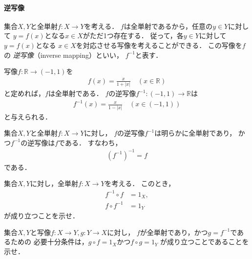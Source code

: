    \paragraph{逆写像}
    集合$X,  Y$と全単射$f: X \longrightarrow Y$を考える．
    $f$は全単射であるから，任意の$y \in Y$に対して
    $y =f(x)$となる$x \in X$がただ1つ存在する．
    従って，各$y \in Y$に対して$y=f(x)$となる
    $x \in X$を対応させる写像を考えることができる．
    この写像を$f$の
    \emph{逆写像}（inverse mapping）といい，
    $f^{-1}$と表す．



    \begin{ex} \label{ex:inversemap1}
      写像$f: \mathbb{R} \longrightarrow (-1,1)$を
      \begin{align*}
        f(x) = \frac{x}{1+ \lvert x \rvert } \quad (x \in \mathbb{R} )
      \end{align*}
      と定めれば，$f$は全単射である．
      $f$の逆写像$f^{-1} : (-1,1) \longrightarrow \mathbb{R} $は
      \begin{align*}
        f^{-1}(x) = \frac{x}{1- \lvert x \rvert } \quad ( x \in (-1,1))
      \end{align*}
      と与えられる．
    \end{ex}

    集合$X,  Y$と全単射$f:X \longrightarrow Y$に対し，
    $f$の逆写像$f^{-1}$は明らかに全単射であり，
    かつ$f^{-1}$の逆写像は$f$である．
    すなわち，
    \begin{align}
      (f^{-1})^{-1} = f
      \label{eq:invinvmap}
    \end{align}
    である．



    \begin{que} \label{que:invcomp}
      集合$X,  Y$に対し，全単射$f:X \longrightarrow Y$を考える．
      このとき，
      \begin{align}
        f^{-1} \circ f & = 1_X ,
        \label{eq:invcompX} \\
        f \circ f^{-1} & = 1_Y 
        \label{eq:invcompY}
      \end{align}
      が成り立つことを示せ．
    \end{que}


    \begin{que} \label{que:mapbijeide}
      集合$X,  Y$と写像$f: X \longrightarrow Y
      ,  g: Y \longrightarrow X$に対し，
      $f$が全単射であり，かつ$g= f^{-1}$であるための
      必要十分条件は，$g \circ f= 1_X$かつ$f \circ g=1_Y$
      が成り立つことであることを示せ．
    \end{que}

